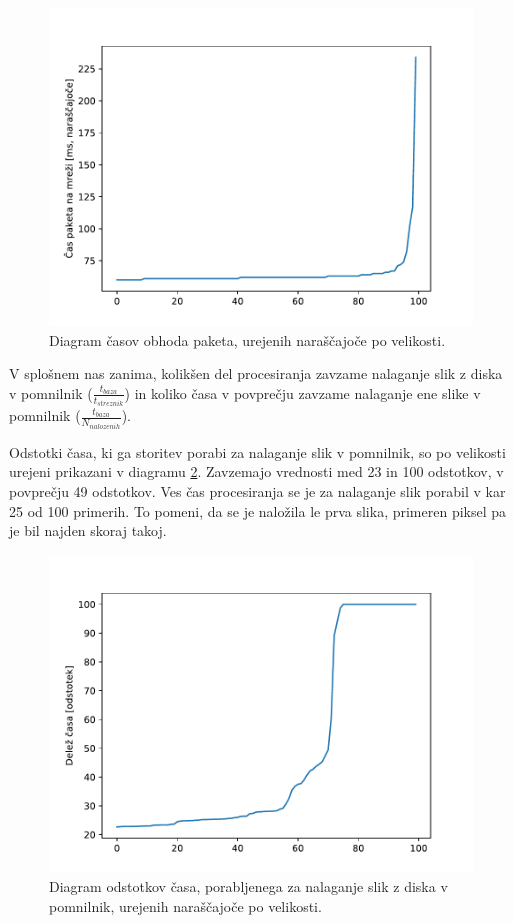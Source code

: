 \begin{figure}[H]
\centering
\includegraphics[scale=0.8]{Img/1_poskusno_transfer_times.pdf}
\caption{Diagram časov obhoda paketa, urejenih naraščajoče po velikosti.}
\label{fig:1_poskusno_transfer_times}
\end{figure}

V splošnem nas zanima, kolikšen del procesiranja zavzame nalaganje slik z diska v pomnilnik ($\frac{t_{baza}}{t_{streznik}}$) in koliko časa v povprečju zavzame nalaganje ene slike v pomnilnik ($\frac{t_{baza}}{N_{nalozenih}}$).

Odstotki časa, ki ga storitev porabi za nalaganje slik v pomnilnik, so po velikosti urejeni prikazani v diagramu \ref{fig:1_poskusno_loading_time_percentage}.
Zavzemajo vrednosti med 23 in 100 odstotkov, v povprečju 49 odstotkov.
Ves čas procesiranja se je za nalaganje slik porabil v kar 25 od 100 primerih.
To pomeni, da se je naložila le prva slika, primeren piksel pa je bil najden skoraj takoj.

\begin{figure}[H]
\centering
\includegraphics[scale=0.8]{Img/1_poskusno_loading_time_percentage.pdf}
\caption{Diagram odstotkov časa, porabljenega za nalaganje slik z diska v pomnilnik, urejenih naraščajoče po velikosti.}
\label{fig:1_poskusno_loading_time_percentage}
\end{figure}

